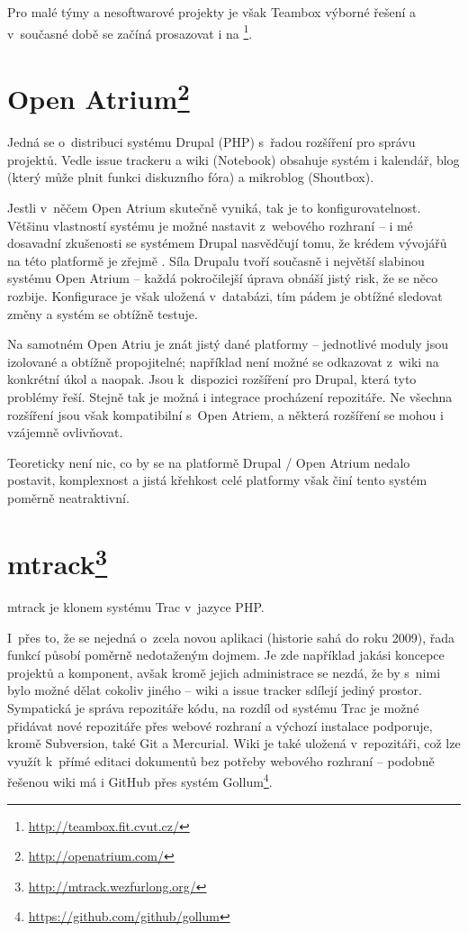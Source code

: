 \documentclass[thesis=B,czech]{FITthesis}[2012/05/02]
\begin{document}
Pro malé týmy a nesoftwarové projekty je však Teambox výborné řešení a
v~současné době se začíná prosazovat i na \footnote{\url{http://teambox.fit.cvut.cz/}}.

\section[Open Atrium]{Open Atrium\footnote{\url{http://openatrium.com/}}}

Jedná se o~distribuci systému Drupal (PHP) s~řadou rozšíření pro správu
projektů. Vedle issue trackeru a wiki (Notebook) obsahuje systém i
kalendář, blog (který může plnit funkci diskuzního fóra) a
\gls{mikroblog} (Shoutbox).

Jestli v~něčem Open Atrium skutečně vyniká, tak je to
konfigurovatelnost. Většinu vlastností systému je možné nastavit
z~webového rozhraní -- i mé dosavadní zkušenosti se systémem Drupal
nasvědčují tomu, že krédem vývojářů na této platformě je zřejmě
. Síla Drupalu tvoří současně i největší
slabinou systému Open Atrium -- každá pokročilejší úprava obnáší jistý
risk, že se něco rozbije. Konfigurace je však uložená v~databázi, tím
pádem je obtížné sledovat změny a systém se obtížně testuje.

Na samotném Open Atriu je znát jistý  dané platformy --
jednotlivé moduly jsou izolované a obtížně propojitelné; například není
možné se odkazovat z~wiki na konkrétní úkol a naopak. Jsou k~dispozici
rozšíření pro Drupal, která tyto problémy řeší. Stejně tak je možná i
integrace procházení repozitáře. Ne všechna rozšíření jsou však
kompatibilní s~Open Atriem, a některá rozšíření se mohou i vzájemně
ovlivňovat.

Teoreticky není nic, co by se na platformě Drupal / Open Atrium nedalo
postavit, komplexnost a jistá křehkost celé platformy však činí tento
systém poměrně neatraktivní.

\section[mtrack]{mtrack\footnote{\url{http://mtrack.wezfurlong.org/}}}

mtrack je klonem systému Trac v~jazyce PHP.

I~přes to, že se nejedná o~zcela novou aplikaci (historie sahá do roku
2009), řada funkcí působí poměrně nedotaženým dojmem. Je zde například
jakási koncepce projektů a komponent, avšak kromě jejich administrace se
nezdá, že by s~nimi bylo možné dělat cokoliv jiného -- wiki a issue
tracker sdílejí jediný prostor. Sympatická je správa repozitáře kódu,
na rozdíl od systému Trac je možné přidávat nové repozitáře přes webové
rozhraní a výchozí instalace podporuje, kromě Subversion, také Git a
Mercurial. Wiki je také uložená v~repozitáři, což lze využít k~přímé
editaci dokumentů bez potřeby webového rozhraní -- podobně řešenou wiki
má i GitHub přes systém Gollum\footnote{\url{https://github.com/github/gollum}}.
\end{document}
